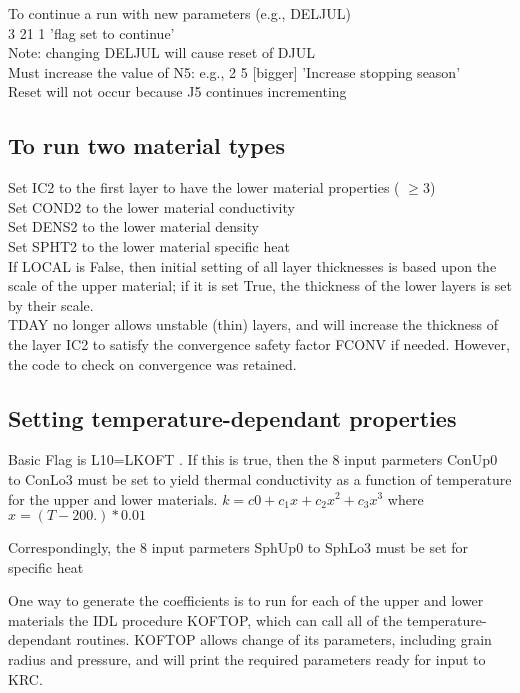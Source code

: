 \documentclass{article}
\newcommand{\qi}{\\ \hspace*{2.em}}      %
\begin{document}
To continue a run with new parameters (e.g., DELJUL)
\qi	3 21 1 'flag set to continue' \\
Note: changing DELJUL will cause reset of DJUL \\
Must increase the value of N5: e.g., 2 5 [bigger] 'Increase stopping season' 
\qi Reset will not occur because J5 continues incrementing


\subsection{ To run two material types } %

Set IC2 to the first layer to have the lower material properties ( $\geq 3$) \\
Set COND2 to the lower material conductivity \\
Set DENS2 to the lower material density \\
Set SPHT2 to the lower material specific heat \\
If LOCAL is False, then initial setting of all layer thicknesses is based
upon the scale of the upper material; if it is set True, the thickness of the
lower layers is set by their scale. \\
  TDAY no longer allows unstable (thin) layers, and will increase the thickness
of the layer IC2 to satisfy the convergence safety factor FCONV if needed. 
However, the code to check on convergence was retained.

\subsection{Setting temperature-dependant properties} %

Basic Flag is L10=LKOFT . If this is true, then the 8 input parmeters ConUp0 to
ConLo3 must be set to yield thermal conductivity as a function of temperature
for the upper and lower materials. $ k=c0 +c_1x + c_2x^2 +c_3x^3 $ where
$x=(T-200.)*0.01$ 

Correspondingly, the 8 input parmeters SphUp0 to SphLo3 must be set for specific
heat
 
One way to generate the coefficients is to run for each of the upper and lower
materials the IDL procedure KOFTOP, which can call all of the
temperature-dependant routines. KOFTOP allows change of its parameters,
including grain radius and pressure, and will print the required parameters
ready for input to KRC.
\end{document}
